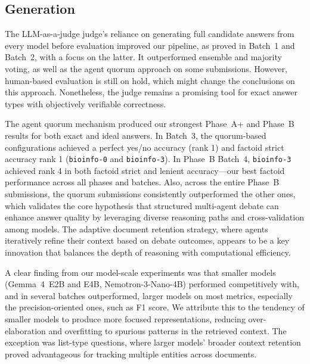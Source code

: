 \subsection{Generation}

The LLM-as-a-judge judge's reliance on generating full candidate answers from every model before evaluation improved our pipeline, as proved in Batch~1 and Batch~2, with a focus on the latter. It outperformed ensemble and majority voting, as well as the agent quorum approach on some submissions. However, human-based evaluation is still on hold, which might change the conclusions on this approach. Nonetheless, the judge remains a promising tool for exact answer types with objectively verifiable correctness.

The agent quorum mechanism produced our strongest Phase~A+ and Phase~B results for both exact and ideal answers. In Batch~3, the quorum-based configurations achieved a perfect yes/no accuracy (rank 1) and factoid strict accuracy rank 1 (\texttt{bioinfo-0} and \texttt{bioinfo-3}). In Phase~B Batch~4, \texttt{bioinfo-3} achieved rank 4 in both factoid strict and lenient accuracy---our best factoid performance across all phases and batches. Also, across the entire Phase~B submissions, the quorum submissions consistently outperformed the other ones, which validates the core hypothesis that structured multi-agent debate can enhance answer quality by leveraging diverse reasoning paths and cross-validation among models. The adaptive document retention strategy, where agents iteratively refine their context based on debate outcomes, appears to be a key innovation that balances the depth of reasoning with computational efficiency.

A clear finding from our model-scale experiments was that smaller models (Gemma~4~E2B and E4B, Nemotron-3-Nano-4B) performed competitively with, and in several batches outperformed, larger models on most metrics, especially the precision-oriented ones, such as F1 score. We attribute this to the tendency of smaller models to produce more focused representations, reducing over-elaboration and overfitting to spurious patterns in the retrieved context. The exception was list-type questions, where larger models' broader context retention proved advantageous for tracking multiple entities across documents.

